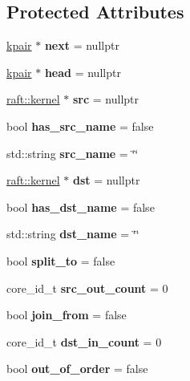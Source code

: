 \subsection*{Protected Attributes}
\begin{DoxyCompactItemize}
\item 
\hypertarget{classkpair_a9bd7d658c3eea85dc1727534ddbac0f5}{}\label{classkpair_a9bd7d658c3eea85dc1727534ddbac0f5} 
\hyperlink{classkpair}{kpair} $\ast$ {\bfseries next} = nullptr
\item 
\hypertarget{classkpair_a52f7dc3e3711392c7c0e5420ed3b117f}{}\label{classkpair_a52f7dc3e3711392c7c0e5420ed3b117f} 
\hyperlink{classkpair}{kpair} $\ast$ {\bfseries head} = nullptr
\item 
\hypertarget{classkpair_a7e0a329b9ea51baf724fab7a1a770219}{}\label{classkpair_a7e0a329b9ea51baf724fab7a1a770219} 
\hyperlink{classraft_1_1kernel}{raft\+::kernel} $\ast$ {\bfseries src} = nullptr
\item 
\hypertarget{classkpair_a4ab2ab705aea934beaa62489aa6f4cd0}{}\label{classkpair_a4ab2ab705aea934beaa62489aa6f4cd0} 
bool {\bfseries has\+\_\+src\+\_\+name} = false
\item 
\hypertarget{classkpair_aee07f4c8112b4bbcbdf7de4060a7bfc3}{}\label{classkpair_aee07f4c8112b4bbcbdf7de4060a7bfc3} 
std\+::string {\bfseries src\+\_\+name} = \char`\"{}\char`\"{}
\item 
\hypertarget{classkpair_a800c548a42885c67364df701c6a7cc5f}{}\label{classkpair_a800c548a42885c67364df701c6a7cc5f} 
\hyperlink{classraft_1_1kernel}{raft\+::kernel} $\ast$ {\bfseries dst} = nullptr
\item 
\hypertarget{classkpair_a847e98eaa4608e693632b434a7d34782}{}\label{classkpair_a847e98eaa4608e693632b434a7d34782} 
bool {\bfseries has\+\_\+dst\+\_\+name} = false
\item 
\hypertarget{classkpair_a7188f45e4b6935bc5d30416762df36a7}{}\label{classkpair_a7188f45e4b6935bc5d30416762df36a7} 
std\+::string {\bfseries dst\+\_\+name} = \char`\"{}\char`\"{}
\item 
\hypertarget{classkpair_acb390c42c0d2b1126af1fe85baf88445}{}\label{classkpair_acb390c42c0d2b1126af1fe85baf88445} 
bool {\bfseries split\+\_\+to} = false
\item 
\hypertarget{classkpair_a5106c89824a5b16f4a99dd73634e46e6}{}\label{classkpair_a5106c89824a5b16f4a99dd73634e46e6} 
core\+\_\+id\+\_\+t {\bfseries src\+\_\+out\+\_\+count} = 0
\item 
\hypertarget{classkpair_acfea41f5b39ed226118d42beca1dab98}{}\label{classkpair_acfea41f5b39ed226118d42beca1dab98} 
bool {\bfseries join\+\_\+from} = false
\item 
\hypertarget{classkpair_a0df0698346ffe526bafd6eb984a4d091}{}\label{classkpair_a0df0698346ffe526bafd6eb984a4d091} 
core\+\_\+id\+\_\+t {\bfseries dst\+\_\+in\+\_\+count} = 0
\item 
\hypertarget{classkpair_a32bfa8c22daa33760e514fa77d01b866}{}\label{classkpair_a32bfa8c22daa33760e514fa77d01b866} 
bool {\bfseries out\+\_\+of\+\_\+order} = false
\end{DoxyCompactItemize}
